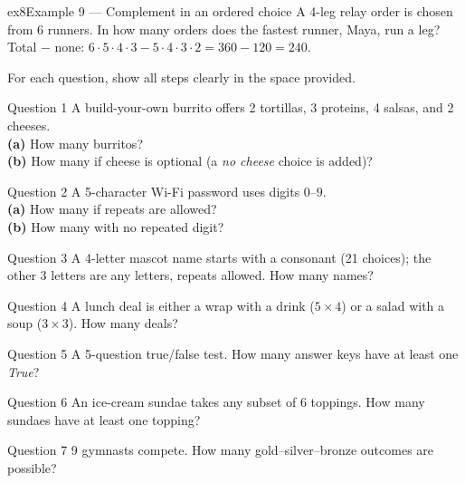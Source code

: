 \documentclass[11pt]{article}
\begin{document}
\begin{example}{ex8}{Example 9 --- Complement in an ordered choice}
A 4-leg relay order is chosen from 6 runners. In how many orders does the fastest runner, Maya, run a leg?\soln Total $-$ none: $6\cdot5\cdot4\cdot3-5\cdot4\cdot3\cdot2=360-120=240$.
\end{example}

\clearpage
{}
For each question, show all steps clearly in the space provided.

\begin{qbox}{Question 1}
A build-your-own burrito offers 2 tortillas, 3 proteins, 4 salsas, and 2 cheeses. \\ \textbf{(a)} How many burritos? \\ \textbf{(b)} How many if cheese is optional (a \emph{no cheese} choice is added)?\workspace{2.4cm}
\end{qbox}

\begin{qbox}{Question 2}
A 5-character Wi-Fi password uses digits $0$--$9$. \\ \textbf{(a)} How many if repeats are allowed? \\ \textbf{(b)} How many with no repeated digit?\workspace{2.4cm}
\end{qbox}

\begin{qbox}{Question 3}
A 4-letter mascot name starts with a consonant (21 choices); the other 3 letters are any letters, repeats allowed. How many names?\workspace{2.4cm}
\end{qbox}

\begin{qbox}{Question 4}
A lunch deal is either a wrap with a drink ($5\times4$) or a salad with a soup ($3\times3$). How many deals?\workspace{2.4cm}
\end{qbox}

\begin{qbox}{Question 5}
A 5-question true/false test. How many answer keys have at least one \emph{True}?\workspace{2.4cm}
\end{qbox}

\begin{qbox}{Question 6}
An ice-cream sundae takes any subset of 6 toppings. How many sundaes have at least one topping?\workspace{2.4cm}
\end{qbox}

\begin{qbox}{Question 7}
9 gymnasts compete. How many gold--silver--bronze outcomes are possible?\workspace{2.4cm}
\end{qbox}
\end{document}
